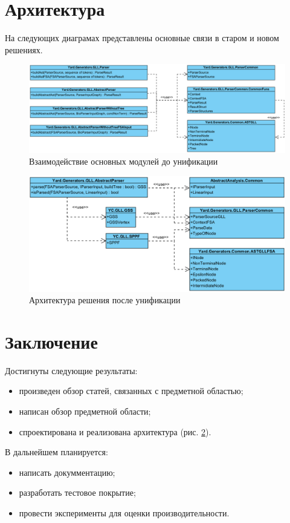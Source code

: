 \documentclass[14pt]{matmex-diploma}
\begin{document}
\section{Архитектура}
На следующих диаграмах представлены основные связи в старом и новом решениях.
\begin{figure}[h]
    \includegraphics[width=\textwidth]{images/Old}
    \caption{Взаимодействие основных модулей до унификации}
    \label{fig:Old}
\end{figure}
\begin{figure}[h]
    \includegraphics[width=\textwidth]{images/New}
    \caption{Архитектура решения после унификации}
    \label{fig:New}
\end{figure}

\section{Заключение}
Достигнуты следующие результаты:
\begin{itemize}
    \item произведен обзор статей, связанных с предметной областью;
    \item написан обзор предметной области;
    \item спроектирована и реализована архитектура (рис. \ref{fig:New}).
\end{itemize}
В дальнейшем планируется:
\begin{itemize}
    \item написать докумментацию;
    \item разработать тестовое покрытие;
    \item провести эксперименты для оценки производительности.
\end{itemize}

\setmonofont[Mapping=tex-text]{CMU Typewriter Text}


\end{document}
